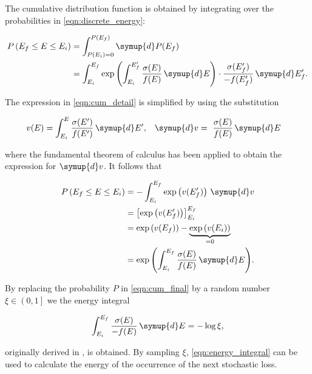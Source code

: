 The cumulative distribution function is obtained by integrating over the probabilities in \eqref{eqn:discrete_energy}:

\begin{equation}
	\label{eqn:cum_detail}
	\begin{split}
	P\left(E_f \leq E \leq E_i\right) &= \int_{P(E_i)=0}^{P(E_f)} \symup{d}P(E_f)\\
	&= \int_{E_i}^{E_f} \exp \left( \int_{E_i}^{E_f'} \frac{\sigma(E)}{ f(E) } \, \symup{d}E \right) \cdot \frac{\sigma(E'_f)}{-f(E'_f)} \, \symup{d}E'_f.
	\end{split}
\end{equation}

The expression in \eqref{eqn:cum_detail} is simplified by using the substitution

\begin{align}
	v(E) &= \int_{E_i}^{E} \frac{\sigma(E')}{f(E')} \, \symup{d}E', & \symup{d}v &= \frac{\sigma(E)}{f(E)} \, \symup{d}E
\end{align}

where the fundamental theorem of calculus has been applied to obtain the expression for $\symup{d}v$.
It follows that

\begin{equation}
	\label{eqn:cum_final}
	\begin{split}
	P\left(E_f \leq E \leq E_i\right) &= - \int_{E_i}^{E_f} \exp \left( v(E_f') \right) \, \symup{d}v \\
	&= \left[ \exp \left( v(E'_f) \right) \right]_{E_i}^{E_f}\\
	&= \exp\left( v(E_f) \right) - \underbrace{\exp \left( v(E_i) \right)}_{= 0} \\
	&= \exp{\left( \int_{E_i}^{E_f} \frac{\sigma(E)}{f(E)} \, \symup{d}E \right)}.
	\end{split}
\end{equation}

By replacing the probability $P$ in \eqref{eqn:cum_final} by a random number $\xi \in \left(0, 1\right]$ we the energy integral

\begin{equation}
	\label{eqn:energy_integral}
	\int_{E_i}^{E_f} \frac{\sigma(E)}{-f(E)} \, \symup{d}E = - \log{\xi},
\end{equation}

originally derived in \cite{chirkin2004propagating}, is obtained. 
By sampling $\xi$, \eqref{eqn:energy_integral} can be used to calculate the energy of the occurrence of the next stochastic loss.

